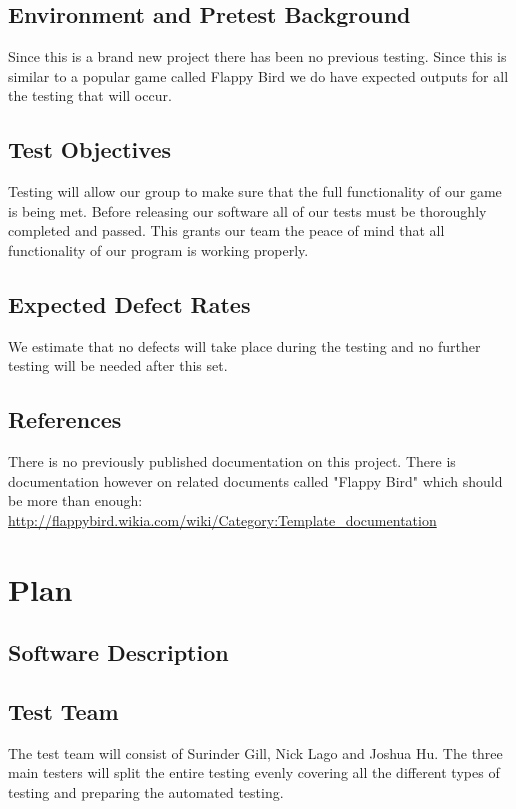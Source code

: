 \documentclass[11pt, oneside]{article}   	%
\begin{document}
\subsection{Environment and Pretest Background}
Since this is a brand new project there has been no previous testing. Since this is similar to a popular game called Flappy Bird we do have expected outputs for all the testing that will occur. 

\subsection{Test Objectives}
Testing will allow our group to make sure that the full functionality of our game is being met. Before releasing our software all of our tests must be thoroughly completed and passed. This grants our team the peace of mind that all functionality of our program is working properly.

\subsection{Expected Defect Rates}
We estimate that no defects will take place during the testing and no further testing will be needed after this set.

\subsection{References}
There is no previously published documentation on this project. There is documentation however on related documents called "Flappy Bird" which should be more than enough: \url{http://flappybird.wikia.com/wiki/Category:Template_documentation}


\section{Plan}
\subsection{Software Description}
%

\subsection{Test Team}
The test team will consist of Surinder Gill, Nick Lago and Joshua Hu. The three main testers will split the entire testing evenly covering all the different types of testing and preparing the automated testing. 
\end{document}
